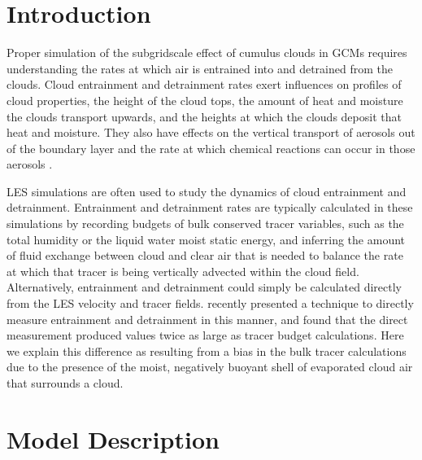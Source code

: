 \documentclass[draft,grl]{AGUTeX}
\begin{document}
\begin{article}

%
%

\section{Introduction}

Proper simulation of the subgridscale effect of cumulus clouds in GCMs 
requires understanding the rates at which air is entrained into and detrained 
from the clouds. Cloud entrainment and detrainment rates exert influences on 
profiles of cloud properties, the height of the cloud tops, the amount of heat 
and moisture the clouds transport upwards, and the heights at which the clouds 
deposit that heat and moisture.  They also have effects on the vertical 
transport of aerosols out of the boundary layer and the rate at which 
chemical reactions can occur in those aerosols 
\citep{Barahona2007,Anldrejczuk2008}. 

LES simulations are often used to study the dynamics of cloud entrainment and 
detrainment.  Entrainment and detrainment rates are typically calculated in 
these simulations by recording budgets of bulk conserved tracer variables, such 
as the total humidity or the liquid water moist static energy, and inferring 
the amount of fluid exchange between cloud and clear air that is needed to 
balance the rate at which that tracer is being vertically advected within the 
cloud field.  Alternatively, entrainment and detrainment could simply be 
calculated directly from the LES velocity and tracer fields.  \cite{Romps2010} 
recently presented a technique to directly measure entrainment and detrainment 
in this manner, and found that the direct measurement produced values twice as 
large as tracer budget calculations.  Here we explain this difference as 
resulting from a bias in the bulk tracer calculations due to the presence of 
the moist, negatively buoyant shell of evaporated cloud air that surrounds a 
cloud.


\section{Model Description}


\end{article}
\end{document}
